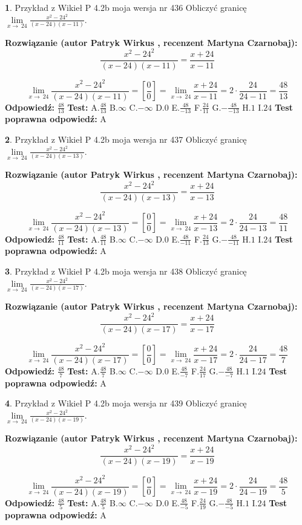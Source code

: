 \documentclass[12pt, a4paper]{article}
\theoremstyle{definition} %
\newtheorem{zad}{}
\newcommand{\zadStart}[1]{\begin{zad}#1\newline}
\newcommand{\zadStop}{\end{zad}}
\newcommand{\rozwStart}[2]{\noindent \textbf{Rozwiązanie (autor #1 , recenzent #2): }\newline}
\newcommand{\rozwStop}{\newline}
\newcommand{\odpStart}{\noindent \textbf{Odpowiedź:}\newline}
\newcommand{\odpStop}{\newline}
\newcommand{\testStart}{\noindent \textbf{Test:}\newline}
\newcommand{\testStop}{\newline}
\newcommand{\kluczStart}{\noindent \textbf{Test poprawna odpowiedź:}\newline}
\newcommand{\kluczStop}{\newline}
\begin{document}
\zadStart{Przykład z Wikieł P 4.2b moja wersja nr 436}
Obliczyć granicę $\lim\limits_{x\to\ 24}\frac{x^{2}-24^{2}}{(x-24)(x-11)}$.
\zadStop
\rozwStart{Patryk Wirkus}{Martyna Czarnobaj}
$$\frac{x^{2}-24^{2}}{(x-24)(x-11)}=\frac{x+24}{x-11}$$

$$\lim\limits_{x\to\ 24}\frac{x^{2}-24^{2}}{(x-24)(x-11)}=[\frac{0}{0}]=\lim\limits_{x\to\ 24}\frac{x+24}{x-11}=2 \cdot \frac{24}{24-11} = \frac{48}{13}$$
\rozwStop
\odpStart
$\frac{48}{13}$
\odpStop
\testStart
A.$\frac{48}{13}$
B.$\infty$
C.$-\infty$
D.$0$
E.$\frac{48}{-13}$
F.$\frac{24}{11}$
G.$-\frac{48}{-13}$
H.$1$
I.$24$
\testStop
\kluczStart
A
\kluczStop



\zadStart{Przykład z Wikieł P 4.2b moja wersja nr 437}
Obliczyć granicę $\lim\limits_{x\to\ 24}\frac{x^{2}-24^{2}}{(x-24)(x-13)}$.
\zadStop
\rozwStart{Patryk Wirkus}{Martyna Czarnobaj}
$$\frac{x^{2}-24^{2}}{(x-24)(x-13)}=\frac{x+24}{x-13}$$

$$\lim\limits_{x\to\ 24}\frac{x^{2}-24^{2}}{(x-24)(x-13)}=[\frac{0}{0}]=\lim\limits_{x\to\ 24}\frac{x+24}{x-13}=2 \cdot \frac{24}{24-13} = \frac{48}{11}$$
\rozwStop
\odpStart
$\frac{48}{11}$
\odpStop
\testStart
A.$\frac{48}{11}$
B.$\infty$
C.$-\infty$
D.$0$
E.$\frac{48}{-11}$
F.$\frac{24}{13}$
G.$-\frac{48}{-11}$
H.$1$
I.$24$
\testStop
\kluczStart
A
\kluczStop



\zadStart{Przykład z Wikieł P 4.2b moja wersja nr 438}
Obliczyć granicę $\lim\limits_{x\to\ 24}\frac{x^{2}-24^{2}}{(x-24)(x-17)}$.
\zadStop
\rozwStart{Patryk Wirkus}{Martyna Czarnobaj}
$$\frac{x^{2}-24^{2}}{(x-24)(x-17)}=\frac{x+24}{x-17}$$

$$\lim\limits_{x\to\ 24}\frac{x^{2}-24^{2}}{(x-24)(x-17)}=[\frac{0}{0}]=\lim\limits_{x\to\ 24}\frac{x+24}{x-17}=2 \cdot \frac{24}{24-17} = \frac{48}{7}$$
\rozwStop
\odpStart
$\frac{48}{7}$
\odpStop
\testStart
A.$\frac{48}{7}$
B.$\infty$
C.$-\infty$
D.$0$
E.$\frac{48}{-7}$
F.$\frac{24}{17}$
G.$-\frac{48}{-7}$
H.$1$
I.$24$
\testStop
\kluczStart
A
\kluczStop



\zadStart{Przykład z Wikieł P 4.2b moja wersja nr 439}
Obliczyć granicę $\lim\limits_{x\to\ 24}\frac{x^{2}-24^{2}}{(x-24)(x-19)}$.
\zadStop
\rozwStart{Patryk Wirkus}{Martyna Czarnobaj}
$$\frac{x^{2}-24^{2}}{(x-24)(x-19)}=\frac{x+24}{x-19}$$

$$\lim\limits_{x\to\ 24}\frac{x^{2}-24^{2}}{(x-24)(x-19)}=[\frac{0}{0}]=\lim\limits_{x\to\ 24}\frac{x+24}{x-19}=2 \cdot \frac{24}{24-19} = \frac{48}{5}$$
\rozwStop
\odpStart
$\frac{48}{5}$
\odpStop
\testStart
A.$\frac{48}{5}$
B.$\infty$
C.$-\infty$
D.$0$
E.$\frac{48}{-5}$
F.$\frac{24}{19}$
G.$-\frac{48}{-5}$
H.$1$
I.$24$
\testStop
\kluczStart
A
\kluczStop
\end{document}
